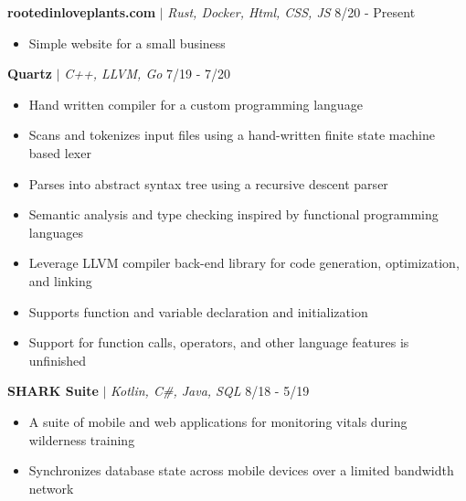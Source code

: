 \documentclass{article}
\newcommand{\project}[3]{\textbf{#1} $|$ \textit{#2} \hfill #3}
\newcommand{\makeListInner}[1]{\begin{itemize}[noitemsep,topsep=0pt] #1 \end{itemize}}
\newcommand{\makeList}[1]{\makeListInner{#1} \medskip}
\begin{document}
    \project{rootedinloveplants.com}{Rust, Docker, Html, CSS, JS}{8/20 - Present} \makeList{
        \item Simple website for a small business
    }


    \project{Quartz}{C++, LLVM, Go}{7/19 - 7/20} \makeList {
        \item Hand written compiler for a custom programming language
        \item Scans and tokenizes input files using a hand-written finite state machine based lexer
        \item Parses into abstract syntax tree using a recursive descent parser
        \item Semantic analysis and type checking inspired by functional programming languages
        \item Leverage LLVM compiler back-end library for code generation, optimization, and linking
        \item Supports function and variable declaration and initialization
        \item Support for function calls, operators, and other language features is unfinished
    }

    \project{SHARK Suite}{Kotlin, C\#, Java, SQL}{8/18 - 5/19} \makeList {
        \item A suite of mobile and web applications for monitoring vitals during wilderness training
        \item Synchronizes database state across mobile devices over a limited bandwidth network
    }
\end{document}

